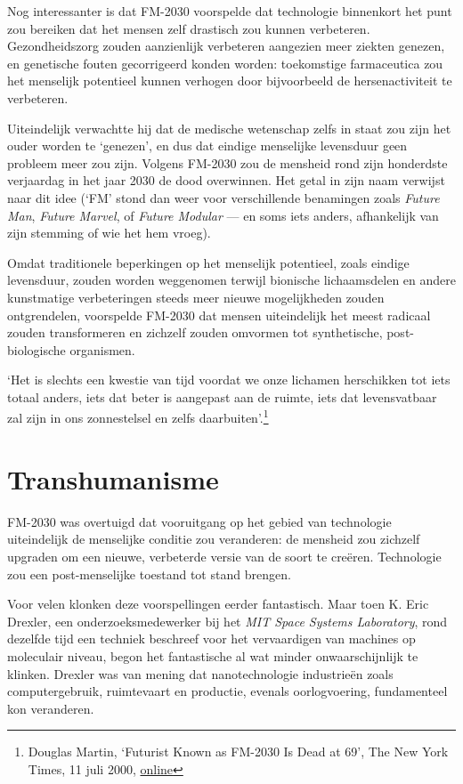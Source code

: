 \documentclass[
  a5paper,
  smalldemyvopaper,11pt,twoside,onecolumn,openright,extrafontsizes]{memoir}
\begin{document}
Nog interessanter is dat FM-2030 voorspelde dat technologie binnenkort
het punt zou bereiken dat het mensen zelf drastisch zou kunnen
verbeteren. Gezondheidszorg zouden aanzienlijk verbeteren aangezien meer
ziekten genezen, en genetische fouten gecorrigeerd konden worden:
toekomstige farmaceutica zou het menselijk potentieel kunnen verhogen
door bijvoorbeeld de hersenactiviteit te verbeteren.

Uiteindelijk verwachtte hij dat de medische wetenschap zelfs in staat
zou zijn het ouder worden te `genezen', en dus dat eindige menselijke
levensduur geen probleem meer zou zijn. Volgens FM-2030 zou de mensheid
rond zijn honderdste verjaardag in het jaar 2030 de dood overwinnen. Het
getal in zijn naam verwijst naar dit idee (`FM' stond dan weer voor
verschillende benamingen zoals \emph{Future Man}, \emph{Future Marvel},
of \emph{Future Modular} --- en soms iets anders, afhankelijk van zijn
stemming of wie het hem vroeg).

Omdat traditionele beperkingen op het menselijk potentieel, zoals
eindige levensduur, zouden worden weggenomen terwijl bionische
lichaamsdelen en andere kunstmatige verbeteringen steeds meer nieuwe
mogelijkheden zouden ontgrendelen, voorspelde FM-2030 dat mensen
uiteindelijk het meest radicaal zouden transformeren en zichzelf zouden
omvormen tot synthetische, post-biologische organismen.

`Het is slechts een kwestie van tijd voordat we onze lichamen
herschikken tot iets totaal anders, iets dat beter is aangepast aan de
ruimte, iets dat levensvatbaar zal zijn in ons zonnestelsel en zelfs
daarbuiten'.\footnote{Douglas Martin, `Futurist Known as FM-2030 Is Dead
  at 69', The New York Times, 11 juli 2000,
  \href{https://www.nytimes.com/2000/07/11/us/futurist-known-as-fm-2030-is-dead-at-69.html}{online}}

\section{Transhumanisme}\label{transhumanisme}

FM-2030 was overtuigd dat vooruitgang op het gebied van technologie
uiteindelijk de menselijke conditie zou veranderen: de mensheid zou
zichzelf upgraden om een nieuwe, verbeterde versie van de soort te
creëren. Technologie zou een post-menselijke toestand tot stand brengen.

Voor velen klonken deze voorspellingen eerder fantastisch. Maar toen K.
Eric Drexler, een onderzoeksmedewerker bij het \emph{MIT Space Systems
Laboratory}, rond dezelfde tijd een techniek beschreef voor het
vervaardigen van machines op moleculair niveau, begon het fantastische
al wat minder onwaarschijnlijk te klinken. Drexler was van mening dat
nanotechnologie industrieën zoals computergebruik, ruimtevaart en
productie, evenals oorlogvoering, fundamenteel kon veranderen.
\end{document}
